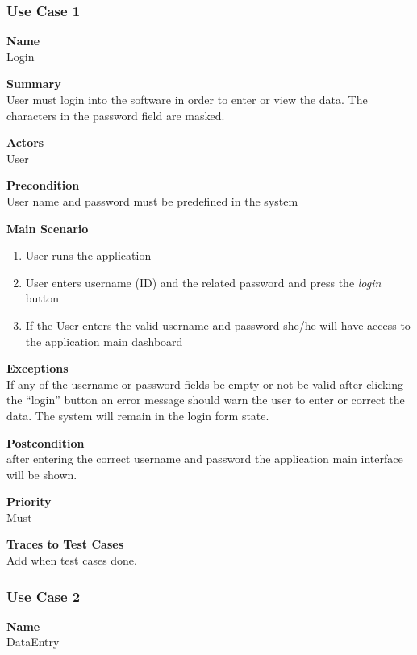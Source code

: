 \documentclass[12pt]{article}
\begin{document}
\subsubsection  {Use Case 1} \label{uc:1}		%

\noindent
{\bf Name}\\
Login 

\noindent
{\bf Summary}\\
User must login into the software in order to enter or view the data.
The characters in the password field are masked.

\noindent
{\bf Actors}\\
User

\noindent
{\bf Precondition}\\
User name and password must be predefined in the system

\noindent
{\bf Main Scenario}\\
\vspace*{-0.2in}
\begin{enumerate}
\item User runs the application
\item User enters username (ID) and the related password and press the \textit{login}  button 
\item If the User enters the valid username and password she/he will have access to the application main dashboard
\end{enumerate}

\noindent
{\bf Exceptions}\\
If any of the username or password fields be empty or not be valid after clicking the “login” button an error message should warn the user to enter or correct the data. The system will remain in the login form state.

\noindent
{\bf Postcondition}\\
after entering the correct username and password the application main interface will be shown.

\noindent
{\bf Priority}\\
Must

\noindent
{\bf Traces to Test Cases}\\
Add when test cases done.


\subsubsection{Use Case 2} \label{uc:1}		%

\noindent
{\bf Name}\\
DataEntry 
\end{document}
